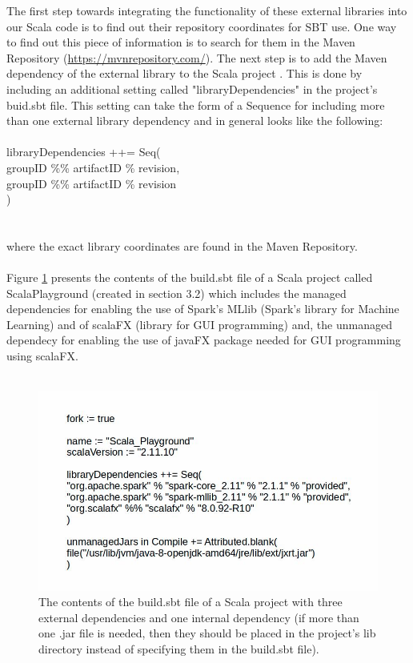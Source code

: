 \documentclass {article}
\begin{document}
The first step towards integrating the functionality of these external libraries into our Scala code is to find out their repository coordinates for SBT use.
 One way to find out this piece of information is to search for them in the Maven Repository (\href{https://mvnrepository.com/}{https://mvnrepository.com/}). 
The next step is to add the Maven dependency of the external library to the Scala project \cite{karau_learning_2015}. 
This is done by including an additional setting called "libraryDependencies" in the project's buid.sbt file.
 This setting can take the form of a Sequence for including more than one external library dependency and in general looks like the following:
\\
\\
libraryDependencies ++= Seq( \\
groupID \%\% artifactID \% revision,\\
groupID \%\% artifactID \% revision\\
)\\
\\
\\
where the exact library coordinates are found in the Maven Repository.
\\
\\
Figure \ref{fig: fig1} presents the contents of the build.sbt file of a Scala project called Scala\underline{\space}Playground (created in section 3.2) which includes the managed dependencies for enabling the use of Spark's MLlib (Spark's library for Machine Learning) and of scalaFX (library for GUI programming) and, the unmanaged dependecy for enabling the use of javaFX package needed for GUI programming using scalaFX.          
\\
\\
\begin{figure} [H]
\includegraphics[width=\linewidth] {fig1.jpg}
\caption{The contents of the build.sbt file of a Scala project with three external dependencies and one internal dependency (if more than one .jar file is needed, then they should be placed in the project's lib directory instead of specifying them in the build.sbt file).}
\label{fig: fig1}
\end{figure}   
\end{document}
